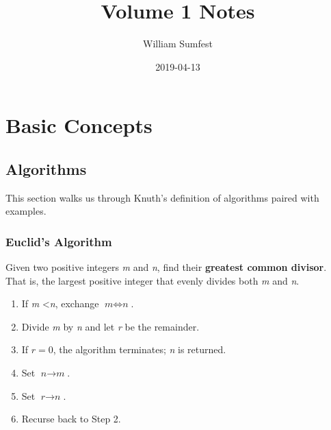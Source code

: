 \documentclass{article}
\title{Volume 1 Notes}
\date{2019-04-13}
\author{William Sumfest}
\begin{document}
	\maketitle
	\newpage

	\section{Basic Concepts}
	\subsection{Algorithms}
	This section walks us through Knuth's definition of algorithms paired with examples.

	\subsubsection{Euclid's Algorithm}
	Given two positive integers \textit{m} and \textit{n}, find their \textbf{greatest common divisor}. That is, the largest positive integer that evenly divides both \textit{m} and \textit{n}.
	\begin{enumerate}
		\item If \textit{m} \textless \textit{n}, exchange $\textit{m} \Leftrightarrow \textit{n}$.
		\item Divide \textit{m} by \textit{n} and let \textit{r} be the remainder.
		\item If $r = 0$, the algorithm terminates; \textit{n} is returned.
		\item Set $\textit{n} \rightarrow \textit{m}$.
		\item Set $\textit{r} \rightarrow \textit{n}$.
		\item Recurse back to Step 2.
	\end{enumerate}
\end{document}
